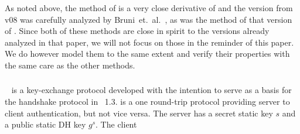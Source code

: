 \subsubsection{\mSigma{}}
As noted above, the \mSigSig{} method of \mEdhoc{} is a very close
derivative of \mSigmaI{} and the version from \mEdhoc{} v08 was carefully analyzed by
Bruni~et.~al.~\cite{DBLP:conf/secsr/BruniJPS18}, as was the \mPskPsk{} method of that version of \mEdhoc{}. Since both of these methods are close in spirit to the versions already analyzed in that paper, we will not focus on those in the reminder of this paper. We do however model them to the same extent and
verify their properties with the same care as the other methods.

\subsubsection{\mOptls{}}
\mOptls~\cite{cryptoeprint:2015:978} is a key-exchange protocol developed {with the intention to serve as a basis for
the} handshake protocol in \mTls\ 1.3. {\mOptls{} is a one round-trip
protocol providing server to client authentication, but not vice versa.}
The server has a
secret static key $s$ and a public static DH key $g^{s}$. The client
